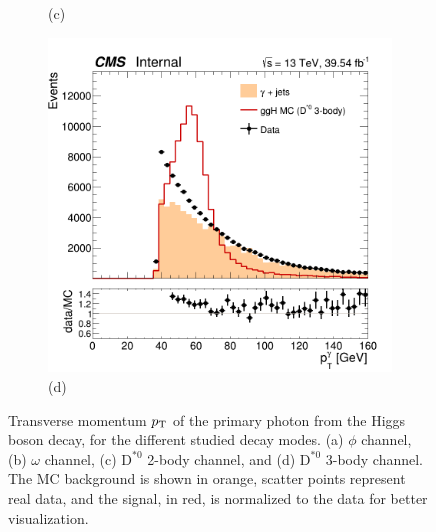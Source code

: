 \begin{figure}[!ht]
\begin{subfigure}[t]{0.50\mylength}
        \vspace*{-0.2cm}
        \caption{\footnotesize (c)}
    \end{subfigure}%
    \begin{subfigure}[t]{0.50\mylength}
        \centering
        \includegraphics[width=0.49\mylength]{resources/plots/D0Star_3body_photon_pt.png}
        \vspace*{-0.2cm}
        \caption{\footnotesize (d)}
    \end{subfigure}%
\caption{Transverse momentum $p_\text{T}$ of the primary photon from the Higgs boson decay, for the different studied decay modes. (a) $\phi$ channel, (b) $\omega$ channel, (c) $\text{D}^{*0}$ 2-body channel, and (d) $\text{D}^{*0}$ 3-body channel. The MC background is shown in orange, scatter points represent real data, and the signal, in red, is normalized to the data for better visualization.}
\label{fig:photon_pt_data}
    \vspace*{-0.0cm}
\end{figure}

